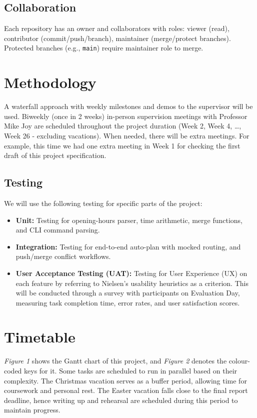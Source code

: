 \documentclass{article}
\begin{document}
\subsection{Collaboration}
Each repository has an owner and collaborators with roles: viewer (read), contributor (commit/push/branch), maintainer (merge/protect branches). Protected branches (e.g., \texttt{main}) require maintainer role to merge.

\section{Methodology}

A waterfall approach with weekly milestones and demos to the supervisor will be used. Biweekly (once in 2 weeks) in-person supervision meetings with Professor Mike Joy are scheduled throughout the project duration (Week 2, Week 4,  \dots, Week 26 - excluding vacations). When needed, there will be extra meetings. For example, this time we had one extra meeting in Week 1 for checking the first draft of this project specification.

\subsection{Testing}
We will use the following testing for specific parts of the project:
\begin{itemize}
    \item \textbf{Unit:} Testing for opening-hours parser, time arithmetic, merge functions, and CLI command parsing.
    \item \textbf{Integration:} Testing for end-to-end auto-plan with mocked routing, and push/merge conflict workflows.
    \item \textbf{User Acceptance Testing (UAT):} Testing for User Experience (UX) on each feature by referring to Nielsen's usability heuristics\cite{nielsen-usability} as a criterion. This will be conducted through a survey with participants on Evaluation Day, measuring task completion time, error rates, and user satisfaction scores.
\end{itemize}

\section{Timetable}

\textit{Figure 1} shows the Gantt chart of this project, and \textit{Figure 2} denotes the colour-coded keys for it. Some tasks are scheduled to run in parallel based on their complexity. The Christmas vacation serves as a buffer period, allowing time for coursework and personal rest. The Easter vacation falls close to the final report deadline, hence writing up and rehearsal are scheduled during this period to maintain progress.
\end{document}
